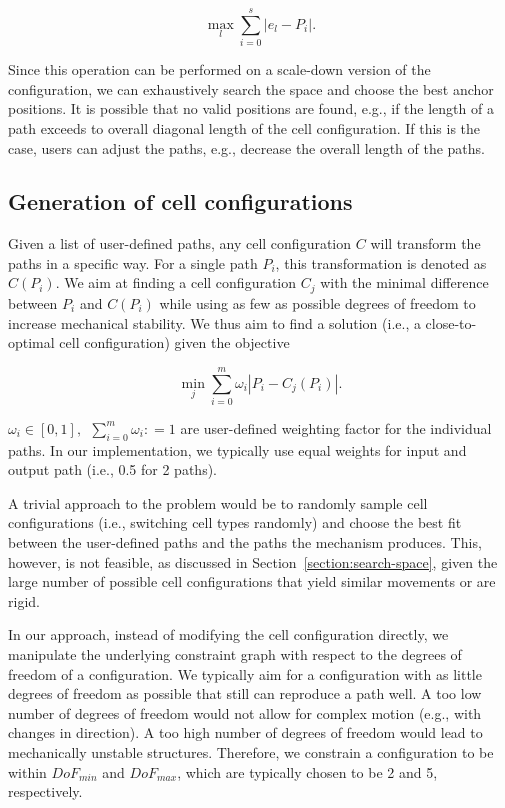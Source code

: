 $$\max_l{\sum_{i=0}^{s}\left|e_l-P_i\right|.}$$

Since this operation can be performed on a scale-down version of the configuration, we can exhaustively search the space and choose the best anchor positions. It is possible that no valid positions are found, e.g., if the length of a path exceeds to overall diagonal length of the cell configuration. If this is the case, users can adjust the paths, e.g., decrease the overall length of the paths.


\subsection{Generation of cell configurations}

Given a list of user-defined paths, any cell configuration $C$ will transform the paths in a specific way. For a single path $P_i$, this transformation is denoted as $C\left(P_i\right)$. We aim at finding a cell configuration $C_j$ with the minimal difference between $P_i$ and $C\left(P_i\right)$ while using as few as possible degrees of freedom to increase mechanical stability. We thus aim to find a solution (i.e., a close-to-optimal cell configuration) given the objective

$$\min_j{\sum_{i=0}^{m}{\omega_i \left| P_i-C_j \left( P_i \right) \right|.}}$$

$\omega_i\in\left[0,1\right],\ \ \sum_{i=0}^{m} \omega_i \mathrel{\mathop:}= 1$ 
are user-defined weighting factor for the individual paths. In our implementation, we typically use equal weights for input and output path (i.e., 0.5 for 2 paths).

A trivial approach to the problem would be to randomly sample cell configurations (i.e., switching cell types randomly) and choose the best fit between the user-defined paths and the paths the mechanism produces. This, however, is not feasible, as discussed in Section~\ref{section:search-space}, given the large number of possible cell configurations that yield similar movements or are rigid. 

In our approach, instead of modifying the cell configuration directly, we manipulate the underlying constraint graph with respect to the degrees of freedom of a configuration. We typically aim for a configuration with as little degrees of freedom as possible that still can reproduce a path well. A too low number of degrees of freedom would not allow for complex motion (e.g., with changes in direction). A too high number of degrees of freedom would lead to mechanically unstable structures. Therefore, we constrain a configuration to be within ${DoF}_{min}$ and ${DoF}_{max}$, which are typically chosen to be 2 and 5, respectively. 

